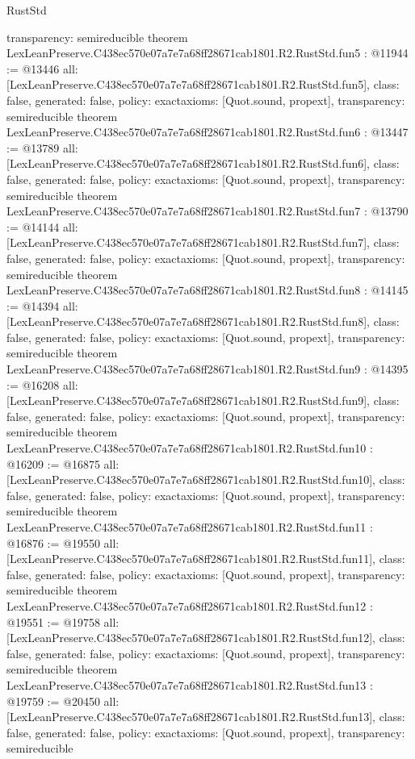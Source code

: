 \begin{lexlean}{RustStd}
\begin{coremodule}
{  transparency: semireducible
}
theorem LexLeanPreserve.C438ec570e07a7e7a68ff28671cab1801.R2.RustStd.fun5 : @11944 := @13446 {
  all: [LexLeanPreserve.C438ec570e07a7e7a68ff28671cab1801.R2.RustStd.fun5],
  class: false,
  generated: false,
  policy: exact{axioms: [Quot.sound, propext]},
  transparency: semireducible
}
theorem LexLeanPreserve.C438ec570e07a7e7a68ff28671cab1801.R2.RustStd.fun6 : @13447 := @13789 {
  all: [LexLeanPreserve.C438ec570e07a7e7a68ff28671cab1801.R2.RustStd.fun6],
  class: false,
  generated: false,
  policy: exact{axioms: [Quot.sound, propext]},
  transparency: semireducible
}
theorem LexLeanPreserve.C438ec570e07a7e7a68ff28671cab1801.R2.RustStd.fun7 : @13790 := @14144 {
  all: [LexLeanPreserve.C438ec570e07a7e7a68ff28671cab1801.R2.RustStd.fun7],
  class: false,
  generated: false,
  policy: exact{axioms: [Quot.sound, propext]},
  transparency: semireducible
}
theorem LexLeanPreserve.C438ec570e07a7e7a68ff28671cab1801.R2.RustStd.fun8 : @14145 := @14394 {
  all: [LexLeanPreserve.C438ec570e07a7e7a68ff28671cab1801.R2.RustStd.fun8],
  class: false,
  generated: false,
  policy: exact{axioms: [Quot.sound, propext]},
  transparency: semireducible
}
theorem LexLeanPreserve.C438ec570e07a7e7a68ff28671cab1801.R2.RustStd.fun9 : @14395 := @16208 {
  all: [LexLeanPreserve.C438ec570e07a7e7a68ff28671cab1801.R2.RustStd.fun9],
  class: false,
  generated: false,
  policy: exact{axioms: [Quot.sound, propext]},
  transparency: semireducible
}
theorem LexLeanPreserve.C438ec570e07a7e7a68ff28671cab1801.R2.RustStd.fun10 : @16209 := @16875 {
  all: [LexLeanPreserve.C438ec570e07a7e7a68ff28671cab1801.R2.RustStd.fun10],
  class: false,
  generated: false,
  policy: exact{axioms: [Quot.sound, propext]},
  transparency: semireducible
}
theorem LexLeanPreserve.C438ec570e07a7e7a68ff28671cab1801.R2.RustStd.fun11 : @16876 := @19550 {
  all: [LexLeanPreserve.C438ec570e07a7e7a68ff28671cab1801.R2.RustStd.fun11],
  class: false,
  generated: false,
  policy: exact{axioms: [Quot.sound, propext]},
  transparency: semireducible
}
theorem LexLeanPreserve.C438ec570e07a7e7a68ff28671cab1801.R2.RustStd.fun12 : @19551 := @19758 {
  all: [LexLeanPreserve.C438ec570e07a7e7a68ff28671cab1801.R2.RustStd.fun12],
  class: false,
  generated: false,
  policy: exact{axioms: [Quot.sound, propext]},
  transparency: semireducible
}
theorem LexLeanPreserve.C438ec570e07a7e7a68ff28671cab1801.R2.RustStd.fun13 : @19759 := @20450 {
  all: [LexLeanPreserve.C438ec570e07a7e7a68ff28671cab1801.R2.RustStd.fun13],
  class: false,
  generated: false,
  policy: exact{axioms: [Quot.sound, propext]},
  transparency: semireducible
}
\end{coremodule}
\end{lexlean}
